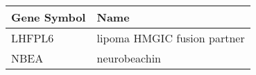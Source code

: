 \begin{tabular}{ll}
\toprule
Gene Symbol &                        Name \\
\midrule
     LHFPL6 & lipoma HMGIC fusion partner \\
       NBEA &                neurobeachin \\
\bottomrule
\end{tabular}
